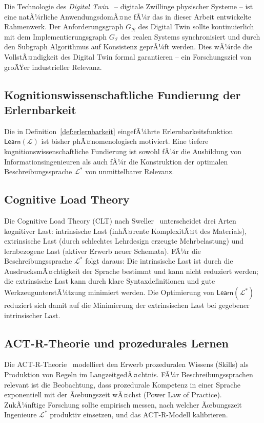 ﻿\documentclass[a4paper,12pt]{report}
\theoremstyle{definition}
\begin{document}
Die Technologie des \emph{Digital Twin}~\cite{grieves2014} -- digitale Zwillinge
physischer Systeme -- ist eine natÃ¼rliche AnwendungsdomÃ¤ne fÃ¼r das in dieser Arbeit
entwickelte Rahmenwerk. Der Anforderungsgraph $G_\mathcal{R}$ des Digital Twin sollte
kontinuierlich mit dem Implementierungsgraph $G_\mathcal{I}$ des realen Systems
synchronisiert und durch den Subgraph Algorithmus auf Konsistenz geprÃ¼ft werden.
Dies wÃ¼rde die VollstÃ¤ndigkeit des Digital Twin formal garantieren -- ein Forschungsziel
von groÃŸer industrieller Relevanz.

\subsection{Kognitionswissenschaftliche Fundierung der Erlernbarkeit}

Die in Definition~\ref{def:erlernbarkeit} eingefÃ¼hrte Erlernbarkeitsfunktion
$\mathsf{Learn}(\mathcal{L})$ ist bisher phÃ¤nomenologisch motiviert. Eine tiefere
kognitionswissenschaftliche Fundierung ist sowohl fÃ¼r die Ausbildung von
Informationsingenieuren als auch fÃ¼r die Konstruktion der optimalen Beschreibungssprache
$\mathcal{L}^*$ von unmittelbarer Relevanz.

\subsection{Cognitive Load Theory}

Die Cognitive Load Theory (CLT) nach Sweller~\cite{sweller1988} unterscheidet drei
Arten kognitiver Last: intrinsische Last (inhÃ¤rente KomplexitÃ¤t des Materials),
extrinsische Last (durch schlechtes Lehrdesign erzeugte Mehrbelastung) und lernbezogene
Last (aktiver Erwerb neuer Schemata). FÃ¼r die Beschreibungssprache $\mathcal{L}^*$
folgt daraus: Die intrinsische Last ist durch die AusdrucksmÃ¤chtigkeit der Sprache
bestimmt und kann nicht reduziert werden; die extrinsische Last kann durch klare
Syntaxdefinitionen und gute WerkzeugunterstÃ¼tzung minimiert werden. Die Optimierung
von $\mathsf{Learn}(\mathcal{L}^*)$ reduziert sich damit auf die Minimierung der
extrinsischen Last bei gegebener intrinsischer Last.

\subsection{ACT-R-Theorie und prozedurales Lernen}

Die ACT-R-Theorie~\cite{anderson1993} modelliert den Erwerb prozeduralen Wissens
(Skills) als Produktion von Regeln im LangzeitgedÃ¤chtnis. FÃ¼r Beschreibungssprachen
relevant ist die Beobachtung, dass prozedurale Kompetenz in einer Sprache exponentiell
mit der Ãœbungszeit wÃ¤chst (Power Law of Practice). ZukÃ¼nftige Forschung sollte
empirisch messen, nach welcher Ãœbungszeit Ingenieure $\mathcal{L}^*$ produktiv
einsetzen, und das ACT-R-Modell kalibrieren.
\end{document}
